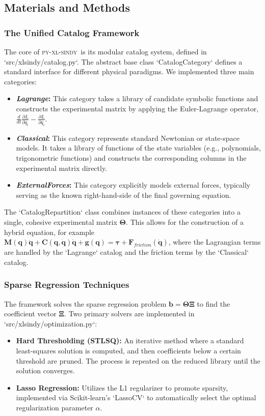 \documentclass[12pt]{article}
\newcommand{\frameworkname}{\textsc{py-xl-sindy}}
\newcommand{\lagrangecat}{\textit{Lagrange}}
\newcommand{\classicalcat}{\textit{Classical}}
\newcommand{\forcescat}{\textit{ExternalForces}}
\begin{document}

\subsection*{Materials and Methods}

\subsubsection*{The Unified Catalog Framework}
The core of \frameworkname\ is its modular catalog system, defined in `src/xlsindy/catalog.py`. The abstract base class `CatalogCategory` defines a standard interface for different physical paradigms. We implemented three main categories:
\begin{itemize}
    \item \textbf{\lagrangecat:} This category takes a library of candidate symbolic functions and constructs the experimental matrix by applying the Euler-Lagrange operator, $\frac{d}{dt}\frac{\partial L}{\partial \dot{q}_i} - \frac{\partial L}{\partial q_i}$.
    \item \textbf{\classicalcat:} This category represents standard Newtonian or state-space models. It takes a library of functions of the state variables (e.g., polynomials, trigonometric functions) and constructs the corresponding columns in the experimental matrix directly.
    \item \textbf{\forcescat:} This category explicitly models external forces, typically serving as the known right-hand-side of the final governing equation.
\end{itemize}
The `CatalogRepartition` class combines instances of these categories into a single, cohesive experimental matrix $\mathbf{\Theta}$. This allows for the construction of a hybrid equation, for example $\mathbf{M}(\mathbf{q})\ddot{\mathbf{q}} + \mathbf{C}(\mathbf{q},\dot{\mathbf{q}})\dot{\mathbf{q}} + \mathbf{g}(\mathbf{q}) = \mathbf{\tau} + \mathbf{F}_{friction}(\dot{\mathbf{q}})$, where the Lagrangian terms are handled by the `Lagrange` catalog and the friction terms by the `Classical` catalog.

\subsubsection*{Sparse Regression Techniques}
The framework solves the sparse regression problem $\mathbf{b} = \mathbf{\Theta}\mathbf{\Xi}$ to find the coefficient vector $\mathbf{\Xi}$. Two primary solvers are implemented in `src/xlsindy/optimization.py`:
\begin{itemize}
    \item \textbf{Hard Thresholding (STLSQ):} An iterative method where a standard least-squares solution is computed, and then coefficients below a certain threshold are pruned. The process is repeated on the reduced library until the solution converges.
    \item \textbf{Lasso Regression:} Utilizes the L1 regularizer to promote sparsity, implemented via Scikit-learn's `LassoCV` to automatically select the optimal regularization parameter $\alpha$.
\end{itemize}
\end{document}
